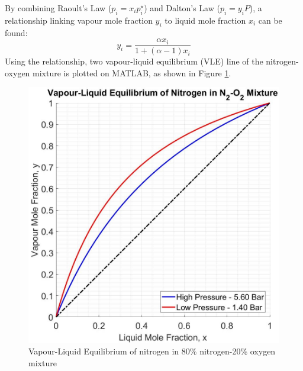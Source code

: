        By combining Raoult's Law ($p_i = x_ip_i^\star$) and Dalton's Law ($p_i=y_iP$), a relationship linking vapour mole fraction $y_i$ to liquid mole fraction $x_i$ can be found: 
        \begin{equation}
            y_i = \frac{\alpha x_i}{1+(\alpha-1)x_i}
            \label{eq:volatility}
        \end{equation}
        Using the relationship, two vapour-liquid equilibrium (VLE) line of the nitrogen-oxygen mixture is plotted on MATLAB, as shown in Figure \ref{VLEdata}. \\
        \begin{figure}[ht]
            \centering
	        \includegraphics[width=0.65\linewidth]{airseparation/graphics/VLEdata.jpg}
	        \caption{Vapour-Liquid Equilibrium of nitrogen in 80\% nitrogen-20\% oxygen mixture}
	        \label{VLEdata}
        \end{figure}
        
